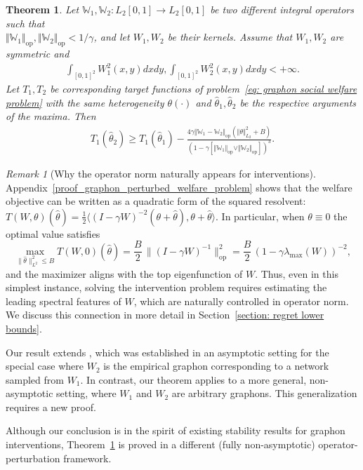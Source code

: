 \documentclass[11pt]{article}
\newcommand{\op}{\mathrm{op}}
\newcommand{\bbW}{\mathbb{W}}
\newcommand{\<}{\langle}
\renewcommand{\>}{\rangle}
\theoremstyle{plain}
\newtheorem{theorem}{Theorem}
\theoremstyle{definition}
\theoremstyle{remark}
\newtheorem{remark}{Remark}
\begin{document}
\begin{theorem}
\label{theorem: graphon perturbed welfare problem}
	Let $\bbW_1, \bbW_2: L_2[0, 1] \to L_2[0, 1]$ be two different integral operators such that \\$\Vert \bbW_1 \Vert_{\op}, \Vert \bbW_2 \Vert_{\op} < 1 / \gamma$, and let $W_1, W_2$ be their kernels. Assume that  $W_1, W_2$ are symmetric and
	\begin{align*}
		\int_{[0, 1]^2} W_1^2(x, y) dx dy, \int_{[0, 1]^2} W_2^2(x, y) dx dy < + \infty.
	\end{align*}	
	Let $T_1, T_2$ be corresponding target functions of problem~\eqref{eq: graphon social welfare problem} with the same heterogeneity $\theta(\cdot)$ and $\hat \theta_1, \hat \theta_2$ be the respective arguments of the maxima. Then
	\begin{align*}
		T_1(\hat{\theta}_2) \ge T_1(\hat{\theta}_1) - \frac{4 \gamma \Vert \bbW_1 - \bbW_2 \Vert_{\op} (\Vert \theta \Vert_{L_2}^2 + B)}{(1 - \gamma [\Vert \bbW_1 \Vert_{\op} \vee \Vert \bbW_2 \Vert_{\op}])^3}.
	\end{align*}
\end{theorem}
\begin{remark}[Why the operator norm naturally appears for interventions]
{Appendix~\ref{proof_graphon_perturbed_welfare_problem} shows that the welfare objective can be written as a quadratic form of the squared resolvent:
$T(W,\theta)(\hat\theta)=\frac12\langle (I-\gamma W)^{-2}(\theta+\hat\theta),\theta+\hat\theta\rangle$.
In particular, when $\theta\equiv 0$ the optimal value satisfies
\[
\max_{\|\hat\theta\|_{L^2}^2\le B} T(W,0)(\hat\theta)
=\frac{B}{2}\,\|(I-\gamma W)^{-1}\|_{\mathrm{op}}^2
=\frac{B}{2}\,(1-\gamma\lambda_{\max}(W))^{-2},
\]
and the maximizer aligns with the top eigenfunction of $W$.
Thus, even in this simplest instance, solving the intervention problem requires estimating the leading spectral
features of $W$, which are naturally controlled in operator norm. We discuss this connection in more detail in Section~\ref{section: regret lower bounds}.}
\end{remark}

Our result extends \citep[Theorem 3]{Parise_Ozdaglar_Econometrica}, which was established in an asymptotic setting for the special case where \( W_2 \) is the empirical graphon corresponding to a network sampled from \( W_1 \). In contrast, our theorem applies to a more general, non-asymptotic setting, where \( W_1 \) and \( W_2 \) are arbitrary graphons. This generalization requires a new proof.  {
Although our conclusion is in the spirit of existing stability results for graphon interventions,
Theorem~\ref{theorem: graphon perturbed welfare problem} is proved in a different (fully non-asymptotic) operator-perturbation framework.

}
\end{document}
